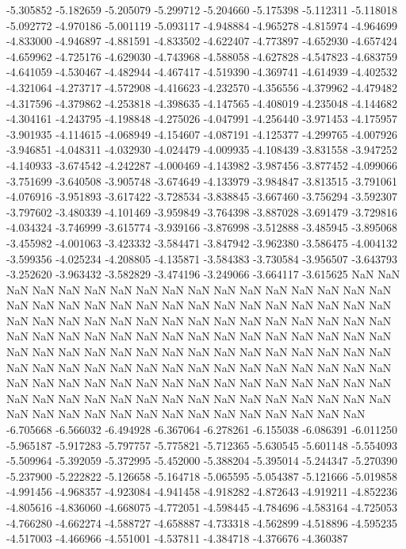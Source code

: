 -5.305852
-5.182659
-5.205079
-5.299712
-5.204660
-5.175398
-5.112311
-5.118018
-5.092772
-4.970186
-5.001119
-5.093117
-4.948884
-4.965278
-4.815974
-4.964699
-4.833000
-4.946897
-4.881591
-4.833502
-4.622407
-4.773897
-4.652930
-4.657424
-4.659962
-4.725176
-4.629030
-4.743968
-4.588058
-4.627828
-4.547823
-4.683759
-4.641059
-4.530467
-4.482944
-4.467417
-4.519390
-4.369741
-4.614939
-4.402532
-4.321064
-4.273717
-4.572908
-4.416623
-4.232570
-4.356556
-4.379962
-4.479482
-4.317596
-4.379862
-4.253818
-4.398635
-4.147565
-4.408019
-4.235048
-4.144682
-4.304161
-4.243795
-4.198848
-4.275026
-4.047991
-4.256440
-3.971453
-4.175957
-3.901935
-4.114615
-4.068949
-4.154607
-4.087191
-4.125377
-4.299765
-4.007926
-3.946851
-4.048311
-4.032930
-4.024479
-4.009935
-4.108439
-3.831558
-3.947252
-4.140933
-3.674542
-4.242287
-4.000469
-4.143982
-3.987456
-3.877452
-4.099066
-3.751699
-3.640508
-3.905748
-3.674649
-4.133979
-3.984847
-3.813515
-3.791061
-4.076916
-3.951893
-3.617422
-3.728534
-3.838845
-3.667460
-3.756294
-3.592307
-3.797602
-3.480339
-4.101469
-3.959849
-3.764398
-3.887028
-3.691479
-3.729816
-4.034324
-3.746999
-3.615774
-3.939166
-3.876998
-3.512888
-3.485945
-3.895068
-3.455982
-4.001063
-3.423332
-3.584471
-3.847942
-3.962380
-3.586475
-4.004132
-3.599356
-4.025234
-4.208805
-4.135871
-3.584383
-3.730584
-3.956507
-3.643793
-3.252620
-3.963432
-3.582829
-3.474196
-3.249066
-3.664117
-3.615625
NaN
NaN
NaN
NaN
NaN
NaN
NaN
NaN
NaN
NaN
NaN
NaN
NaN
NaN
NaN
NaN
NaN
NaN
NaN
NaN
NaN
NaN
NaN
NaN
NaN
NaN
NaN
NaN
NaN
NaN
NaN
NaN
NaN
NaN
NaN
NaN
NaN
NaN
NaN
NaN
NaN
NaN
NaN
NaN
NaN
NaN
NaN
NaN
NaN
NaN
NaN
NaN
NaN
NaN
NaN
NaN
NaN
NaN
NaN
NaN
NaN
NaN
NaN
NaN
NaN
NaN
NaN
NaN
NaN
NaN
NaN
NaN
NaN
NaN
NaN
NaN
NaN
NaN
NaN
NaN
NaN
NaN
NaN
NaN
NaN
NaN
NaN
NaN
NaN
NaN
NaN
NaN
NaN
NaN
NaN
NaN
NaN
NaN
NaN
NaN
NaN
NaN
NaN
NaN
NaN
NaN
NaN
NaN
NaN
NaN
NaN
NaN
NaN
NaN
NaN
NaN
NaN
NaN
NaN
NaN
NaN
NaN
NaN
NaN
NaN
NaN
NaN
NaN
NaN
NaN
NaN
NaN
NaN
NaN
NaN
NaN
-6.705668
-6.566032
-6.494928
-6.367064
-6.278261
-6.155038
-6.086391
-6.011250
-5.965187
-5.917283
-5.797757
-5.775821
-5.712365
-5.630545
-5.601148
-5.554093
-5.509964
-5.392059
-5.372995
-5.452000
-5.388204
-5.395014
-5.244347
-5.270390
-5.237900
-5.222822
-5.126658
-5.164718
-5.065595
-5.054387
-5.121666
-5.019858
-4.991456
-4.968357
-4.923084
-4.941458
-4.918282
-4.872643
-4.919211
-4.852236
-4.805616
-4.836060
-4.668075
-4.772051
-4.598445
-4.784696
-4.583164
-4.725053
-4.766280
-4.662274
-4.588727
-4.658887
-4.733318
-4.562899
-4.518896
-4.595235
-4.517003
-4.466966
-4.551001
-4.537811
-4.384718
-4.376676
-4.360387
